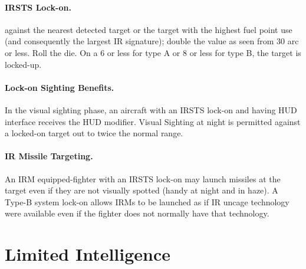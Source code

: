 \begin{advancedrules}
\paragraph{IRSTS Lock-on.}  against the nearest detected target or the target with the highest fuel point use (and consequently the largest IR signature); double the value as seen from 30{\deg} arc or less.  Roll the die. On a 6 or less for type A or 8 or less for type B, the target is locked-up. 


\paragraph{Lock-on Sighting Benefits.} In the visual sighting phase, an aircraft with an IRSTS lock-on and having HUD interface receives the HUD modifier. Visual Sighting at night is permitted against a locked-on target out to twice the normal range.

\paragraph{IR Missile Targeting.} An IRM equipped-fighter with an IRSTS lock-on may launch missiles at the target even if they are not visually spotted (handy at night and in haze).  A Type-B system lock-on allows IRMs to be launched as if IR uncage technology were available even if the fighter does not normally have that technology.

\section{Limited Intelligence}
\label{rule:limited-intelligence}


\end{advancedrules}
